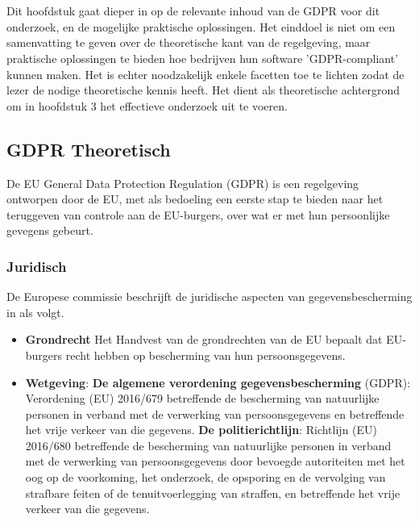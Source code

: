 \chapter{}
\label{ch:stand-van-zaken}



Dit hoofdstuk gaat dieper in op de relevante inhoud van de GDPR voor dit onderzoek, en de mogelijke praktische oplossingen. 
Het einddoel is niet om een samenvatting te geven over de theoretische kant van de regelgeving, maar praktische oplossingen te bieden hoe bedrijven hun software 'GDPR-compliant' kunnen maken. 
Het is echter noodzakelijk enkele facetten toe te lichten zodat de lezer de nodige theoretische kennis heeft.
 Het dient als theoretische achtergrond om in hoofdstuk 3 het effectieve onderzoek uit te voeren.
 
 
\section{{GDPR Theoretisch}}

De EU General Data Protection Regulation (GDPR) is een regelgeving ontworpen door de EU, met als bedoeling een eerste stap te bieden naar het teruggeven van controle aan de EU-burgers, over wat er met hun persoonlijke gevegens gebeurt. 

\subsection{Juridisch}
De Europese commissie beschrijft de juridische aspecten van gegevensbescherming in \autocite{Eucom2018} als volgt.

\begin{itemize}
    \item \textbf{Grondrecht} Het Handvest van de grondrechten van de EU bepaalt dat EU-burgers recht hebben op bescherming van hun persoonsgegevens.
    \item \textbf{Wetgeving}: 
    \subitem \textbf{De algemene verordening gegevensbescherming} (GDPR): 
    Verordening (EU) 2016/679 betreffende de bescherming van natuurlijke personen in verband met de verwerking van persoonsgegevens en betreffende het vrije verkeer van die gegevens.
    \subitem \textbf{De politierichtlijn}: 
    Richtlijn (EU) 2016/680 betreffende de bescherming van natuurlijke personen in verband met de verwerking van persoonsgegevens door bevoegde autoriteiten met het oog op de voorkoming, het onderzoek, de opsporing en de vervolging van strafbare feiten of de tenuitvoerlegging van straffen, en betreffende het vrije verkeer van die gegevens.
   
\end{itemize}

